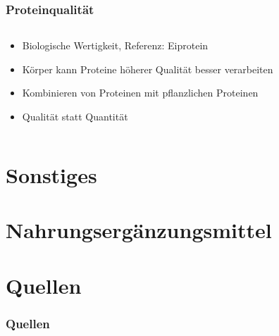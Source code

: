 \documentclass[ngerman, aspectratio=169]{beamer}
\begin{document}
\begin{frame}
  \frametitle{Proteinqualität}
  \begin{columns}
    \begin{column}{0.4\textwidth}

      \begin{itemize}
      \item<+-> Biologische Wertigkeit, Referenz: Eiprotein
      \item<+-> Körper kann Proteine höherer Qualität besser verarbeiten
      \item<+-> Kombinieren von Proteinen mit pflanzlichen Proteinen
      \item<+-> Qualität statt Quantität
      \end{itemize}
    \end{column}
    
    \begin{column}{0.6\textwidth}
    \end{column}
    
  \end{columns}
\end{frame}


\section{Sonstiges}
\section{Nahrungsergänzungsmittel}


\section{Quellen}
\begin{frame}
  \frametitle{Quellen}
  \printbibliography
  

\end{frame}
\end{document}
